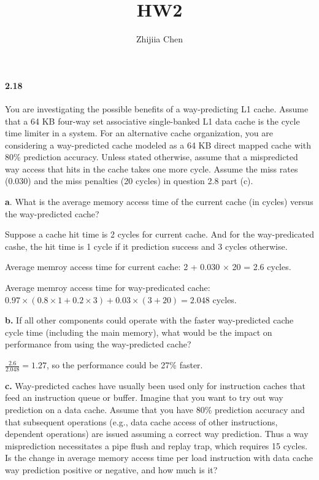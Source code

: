 \documentclass{article}
\title{HW2}
\author{Zhijiia Chen}
\begin{document}
\maketitle

\paragraph{2.18} You are investigating the possible benefits of a way-predicting L1 cache. Assume that a 64 KB four-way set associative single-banked L1 data cache is the cycle time limiter in a system. For an alternative cache organization, you are considering a way-predicted cache modeled as a 64 KB direct mapped cache with 80\% prediction accuracy. Unless stated otherwise, assume that a mispredicted way access that hits in the cache takes one more cycle. Assume the miss rates (0.030) and the miss penalties (20 cycles) in question 2.8 part (c).

\textbf{a}. What is the average memory access time of the current cache (in cycles) versus the way-predicted cache?

Suppose a cache hit time is 2 cycles for current cache. And for the way-predicated cashe, the hit time is 1 cycle if it prediction success and 3 cycles otherwise.

Average memroy access time for current cache: 2 + 0.030 $\times$ 20 = 2.6 cycles.

Average memroy access time for way-predicated cache: $0.97\times(0.8\times1+0.2\times3)+0.03\times(3+20)=2.048$ cycles.

\textbf{b.} If all other components could operate with the faster way-predicted cache cycle time (including the main memory), what would be the impact on performance from using the way-predicted cache?

$\frac{2.6}{2.048}=1.27$, so the performance could be 27\% faster.

\textbf{c.} Way-predicted caches have usually been used only for instruction caches that feed an instruction queue or buffer. Imagine that you want to try out way prediction on a data cache. Assume that you have 80\% prediction accuracy and that subsequent operations (e.g., data cache access of other instructions, dependent operations) are issued assuming a correct way prediction. Thus a way misprediction necessitates a pipe flush and replay trap, which requires 15 cycles. Is the change in average memory access time per load instruction with data cache way prediction positive or negative, and how much is it?
\end{document}
